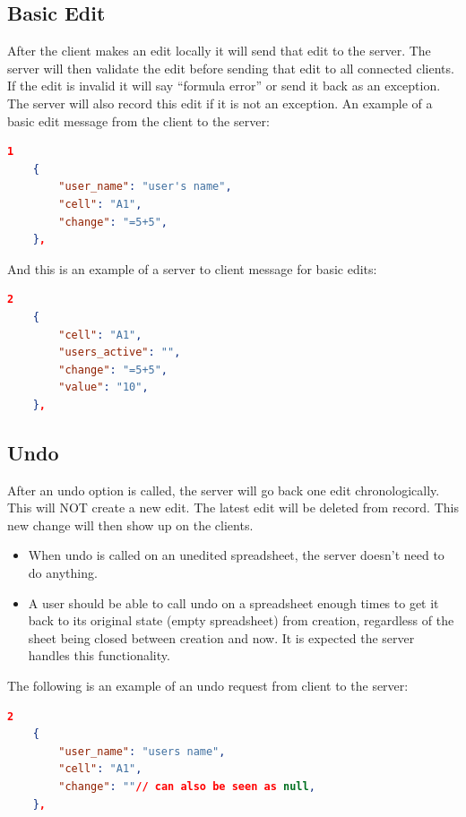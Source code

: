 \documentclass[titlepage]{article}
\begin{document}
\subsection{Basic Edit}
    After the client makes an edit locally it will send that edit to the server. The
    server will then validate the edit before sending that edit to all connected clients.
    If the edit is invalid it will say “formula error” or send it back as an exception.
    The server will also record this edit if it is not an exception. An example of a 
    basic edit message from the client to the server:
    \begin{lstlisting}[language=json,firstnumber=1]
    1
    {
        "user_name": "user's name",
        "cell": "A1",
        "change": "=5+5",
    }, 
    \end{lstlisting}
    And this is an example of a server to client message for basic edits:
    \begin{lstlisting}[language=json,firstnumber=1]
    2
    {
        "cell": "A1",
        "users_active": "",
        "change": "=5+5",
        "value": "10",
    }, 
    \end{lstlisting}
\subsection{Undo}
    After an undo option is called, the server will go back one edit chronologically. This will 
    NOT create a new edit. The latest edit will be deleted from record. This new change will
     then show up on the clients.
    \begin{itemize}
        \item When undo is called on an unedited spreadsheet, the server doesn’t need to do anything.
        \item A user should be able to call undo on a spreadsheet enough times to get it back to its original state (empty spreadsheet) from creation, regardless of the sheet being closed between creation and now. It is expected the server handles this functionality.
    \end{itemize}
    The following is an example of an undo request from client to the server:
    \begin{lstlisting}[language=json,firstnumber=1]
    2
    {
        "user_name": "users name",
        "cell": "A1",
        "change": ""// can also be seen as null,
    }, 
    \end{lstlisting}
\end{document}
